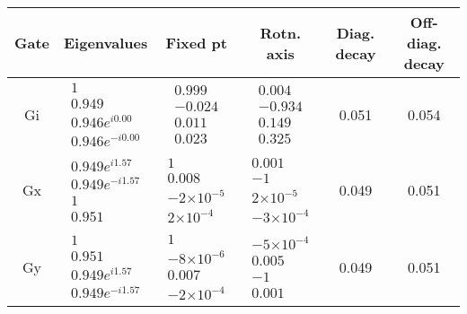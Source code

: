 \documentclass{article}[11pt]
\providecommand{\e}[1]{\ensuremath{\times 10^{#1}}}
\begin{document}
\begin{table}[h]
\small
\begin{center}
\begin{tabular}[l]{|c|c|c|c|c|c|}
\hline
Gate & Eigenvalues & Fixed pt & Rotn. axis & Diag. decay & Off-diag. decay \\ \hline
Gi & $ \begin{array}{c}
1 \\ 
0.949 \\ 
0.946e^{i0.00} \\ 
0.946e^{-i0.00}
 \end{array} $
 & $ \begin{array}{c}
0.999 \\ 
-0.024 \\ 
0.011 \\ 
0.023
 \end{array} $
 & $ \begin{array}{c}
0.004 \\ 
-0.934 \\ 
0.149 \\ 
0.325
 \end{array} $
 & 0.051 & 0.054 \\ \hline
Gx & $ \begin{array}{c}
0.949e^{i1.57} \\ 
0.949e^{-i1.57} \\ 
1 \\ 
0.951
 \end{array} $
 & $ \begin{array}{c}
1 \\ 
0.008 \\ 
-2\e{-5} \\ 
2\e{-4}
 \end{array} $
 & $ \begin{array}{c}
0.001 \\ 
-1 \\ 
2\e{-5} \\ 
-3\e{-4}
 \end{array} $
 & 0.049 & 0.051 \\ \hline
Gy & $ \begin{array}{c}
1 \\ 
0.951 \\ 
0.949e^{i1.57} \\ 
0.949e^{-i1.57}
 \end{array} $
 & $ \begin{array}{c}
1 \\ 
-8\e{-6} \\ 
0.007 \\ 
-2\e{-4}
 \end{array} $
 & $ \begin{array}{c}
-5\e{-4} \\ 
0.005 \\ 
-1 \\ 
0.001
 \end{array} $
 & 0.049 & 0.051 \\ \hline
\end{tabular}


\end{center}
\end{table}
\end{document}
